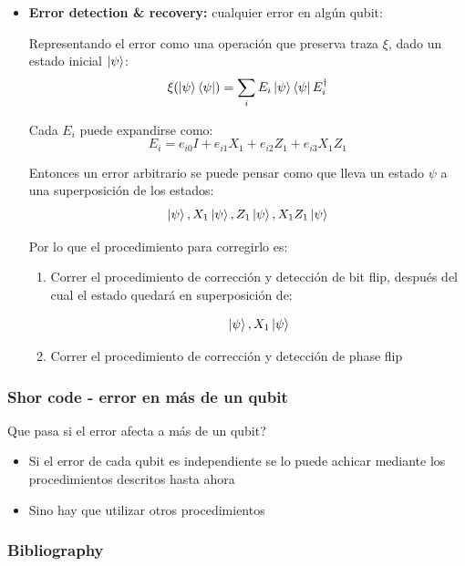 \documentclass[10pt]{beamer}
\theoremstyle{remark}
\theoremstyle{definition}
\begin{document}
\begin{frame}[allowframebreaks]
    \framebreak

    \begin{itemize}
        \item \textbf{Error detection \& recovery:} cualquier error en algún qubit:
    
        \vspace{0.2cm}

        Representando el error como una operación que preserva traza $\xi$, dado un estado inicial $\ket{\psi}$:
        \[
            \xi(\ket{\psi}\bra{\psi}) = \sum_i{E_i\ket{\psi}\bra{\psi}E_i^{\dag}}
        \]

        Cada $E_i$ puede expandirse como:
        \[
            E_i = e_{i0}I + e_{i1}X_1 + e_{i2}Z_1 + e_{i3}X_1Z_1
        \]
        
        \framebreak

        Entonces un error arbitrario se puede pensar como que lleva un estado $\psi$ a una superposición de los estados:
        \[
            \ket{\psi}, X_1\ket{\psi}, Z_1\ket{\psi}, X_1Z_1\ket{\psi}
        \]

        Por lo que el procedimiento para corregirlo es:

        \begin{enumerate}
            \item Correr el procedimiento de corrección y detección de bit flip, después del cual el estado quedará en superposición de:
            
            \[
                \ket{\psi}, X_1\ket{\psi}
            \]

            \item Correr el procedimiento de corrección y detección de phase flip
        \end{enumerate}
    \end{itemize}
\end{frame}

\begin{frame}[allowframebreaks]
    \frametitle{Shor code - error en más de un qubit}

    Que pasa si el error afecta a más de un qubit?

    \begin{itemize}
        \item Si el error de cada qubit es independiente se lo puede achicar mediante los procedimientos descritos hasta ahora
        \item Sino hay que utilizar otros procedimientos
    \end{itemize}

\end{frame}

\begin{frame}[allowframebreaks]
    \frametitle{Bibliography}

    \nocite{*}
    \printbibliography
\end{frame}
\end{document}
